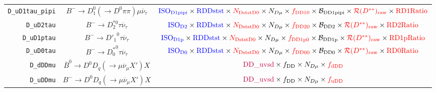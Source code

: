 \begin{landscape}
\begin{table}
\begin{tabular}{r|c|c}
 \texttt{D\_uD1tau\_pipi} &       $B^- \rightarrow D_1^0 (\rightarrow D^0 \pi\pi) \mu \overline{\nu}_\tau$       &                        $\textcolor{blue}{\text{ISO}_\text{D1pipi}} \times \textcolor{blue}{\text{RDDstst}} \times \textcolor{red}{N_\text{DststD0}} \times N_{D \mu} \times \textcolor{red}{f_\text{DD10}} \times \mathcal{B}_\text{DD1pipi} \times \textcolor{red}{\mathcal{R}(D^{**})_\text{raw}} \times \textcolor{red}{\text{RD1Ratio}}$                        \\
       \texttt{D\_uD2tau} &                 $B^- \rightarrow D_2^{*0} \tau \overline{\nu}_\tau$                  &                            $\textcolor{blue}{\text{ISO}_\text{D2}} \times \textcolor{blue}{\text{RDDstst}} \times \textcolor{red}{N_\text{DststD0}} \times N_{D \mu} \times \textcolor{red}{f_\text{DD20}} \times \mathcal{B}_\text{DD2} \times \textcolor{red}{\mathcal{R}(D^{**})_\text{raw}} \times \textcolor{red}{\text{RD2Ratio}}$                            \\
      \texttt{D\_uD1ptau} &                 $B^- \rightarrow {D'_1}^0 \tau \overline{\nu}_\tau$                  &                          $\textcolor{blue}{\text{ISO}_\text{D1p}} \times \textcolor{blue}{\text{RDDstst}} \times \textcolor{red}{N_\text{DststD0}} \times N_{D \mu} \times \textcolor{red}{f_\text{DD1p0}} \times \mathcal{B}_\text{DD1p} \times \textcolor{red}{\mathcal{R}(D^{**})_\text{raw}} \times \textcolor{red}{\text{RD1pRatio}}$                          \\
       \texttt{D\_uD0tau} &                 $B^- \rightarrow {D^*_0}^0 \tau \overline{\nu}_\tau$                 &                            $\textcolor{blue}{\text{ISO}_\text{D0}} \times \textcolor{blue}{\text{RDDstst}} \times \textcolor{red}{N_\text{DststD0}} \times N_{D \mu} \times \textcolor{red}{f_\text{DD00}} \times \mathcal{B}_\text{DD0} \times \textcolor{red}{\mathcal{R}(D^{**})_\text{raw}} \times \textcolor{red}{\text{RD0Ratio}}$                            \\
        \texttt{D\_dDDmu} &    $\overline{B}^0 \rightarrow D^0 D_q (\rightarrow \mu \overline{\nu}_\mu X') X$    &                                                                                                                           $\textcolor{purple}{\text{DD\_uvsd}} \times f_\text{DD} \times N_{D \mu} \times \textcolor{red}{f_\text{dDD}}$                                                                                                                            \\
        \texttt{D\_uDDmu} &         $B^- \rightarrow D^0 D_q (\rightarrow \mu \overline{\nu}_\mu X') X$          &                                                                                                                           $\textcolor{purple}{\text{DD\_uvsd}} \times f_\text{DD} \times N_{D \mu} \times \textcolor{red}{f_\text{uDD}}$                                                                                                                            \\

\end{tabular}
\end{table}
\end{landscape}
